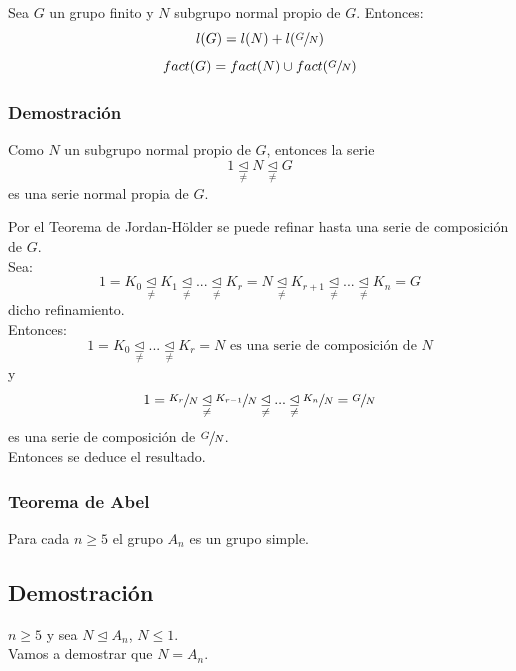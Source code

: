 \documentclass[11pt,a4paper]{article}
\begin{document}
Sea $G$ un grupo finito y $N$ subgrupo normal propio de $G$. Entonces:
$$l(G) = l(N) + l(\sfrac{G}{N})$$
$$fact(G) = fact(N) \cup fact(\sfrac{G}{N})$$

\subsubsection*{Demostración}

Como $N$ un subgrupo normal propio de $G$, entonces la serie
$$1 \underset{\neq}{\unlhd} N \underset{\neq}{\unlhd} G$$
es una serie normal propia de $G$.

Por el Teorema de Jordan-Hölder se puede refinar hasta una serie de composición de $G$. \\
Sea:
$$1 = K_{0} \underset{\neq}{\unlhd} K_{1} \underset{\neq}{\unlhd} ... \underset{\neq}{\unlhd} K_{r} = N \underset{\neq}{\unlhd} K_{r+1} \underset{\neq}{\unlhd} ... \underset{\neq}{\unlhd} K_{n} = G$$
dicho refinamiento. \\
Entonces:
$$1 = K_{0} \underset{\neq}{\unlhd} ... \underset{\neq}{\unlhd} K_{r} = N \text{ es una serie de composición de } N$$
y
$$1 = \sfrac{K_{r}}{N} \underset{\neq}{\unlhd} \sfrac{K_{r-1}}{N} \underset{\neq}{\unlhd} ... \underset{\neq}{\unlhd} \sfrac{K_{n}}{N} = \sfrac{G}{N}$$
es una serie de composición de $\sfrac{G}{N}$. \\
Entonces se deduce el resultado.

\subsubsection*{Teorema de Abel}

Para cada $n \geq 5$ el grupo $A_{n}$ es un grupo simple.

\subsection*{Demostración}

$n \geq 5$ y sea $N \unlhd A_{n}$, $N \leq 1$. \\
Vamos a demostrar que $N = A_{n}$.
\end{document}
